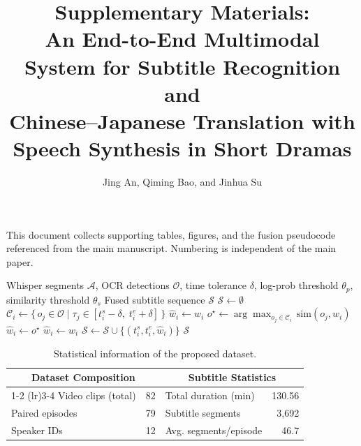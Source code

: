 \documentclass[11pt]{article}
\title{\vspace{-1.5em}Supplementary Materials:\\ An End-to-End Multimodal System for Subtitle Recognition and\\ Chinese--Japanese Translation with Speech Synthesis in Short Dramas}
\author{Jing An, Qiming Bao, and Jinhua Su}
\date{}
\begin{document}
\maketitle
\vspace{-1.5em}
\noindent This document collects supporting tables, figures, and the fusion pseudocode referenced from the main manuscript. Numbering is independent of the main paper.

\begin{algorithm}[t]
\caption{Confidence-Adaptive OCR/ASR Fusion}
\label{alg:fusion}
\begin{algorithmic}[1]
\Require Whisper segments $\mathcal{A}$, OCR detections $\mathcal{O}$, time tolerance $\delta$, log-prob threshold $\theta_p$, similarity threshold $\theta_s$
\Ensure Fused subtitle sequence $\mathcal{S}$
\State $\mathcal{S} \gets \emptyset$
    \State $\mathcal{C}_i \gets \{\, o_j \in \mathcal{O} \mid \tau_j \in [t_i^s - \delta,\; t_i^e + \delta]\,\}$ 
     
        \State $\hat{w}_i \gets w_i$
    \Else
        \State $o^\star \gets \arg\max_{o_j \in \mathcal{C}_i}\, \mathrm{sim}(o_j, w_i)$ 
            \State $\hat{w}_i \gets o^\star$ 
        \Else
            \State $\hat{w}_i \gets w_i$ 
        \EndIf
    \EndIf
    \State $\mathcal{S} \gets \mathcal{S} \cup \{(t_i^s, t_i^e, \hat{w}_i)\}$
\EndFor
\State \Return $\mathcal{S}$
\end{algorithmic}
\end{algorithm}

\begin{table}[t]
\centering
\caption{Statistical information of the proposed dataset.}
\label{tab:dataset}
\begin{tabular}{lrlr}
\toprule
\multicolumn{2}{c}{\textbf{Dataset Composition}} & \multicolumn{2}{c}{\textbf{Subtitle Statistics}} \\
\cmidrule(lr){1-2} \cmidrule(lr){3-4}
Video clips (total) & 82 & Total duration (min) & 130.56 \\
Paired episodes & 79 & Subtitle segments & 3{,}692 \\
Speaker IDs & 12 & Avg. segments/episode & 46.7 \\
\bottomrule
\end{tabular}
\end{table}
\end{document}
